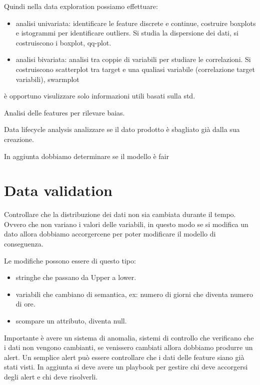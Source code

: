 Quindi nella data exploration possiamo effettuare:
\begin{itemize}
    \item analisi univariata: identificare le feature discrete e continue,
    costruire boxplots e istogrammi per identificare outliers. Si studia la dispersione 
    dei dati, si costruiscono i boxplot, qq-plot.
    \item analisi bivariata: analisi tra coppie di variabili per studiare le correlazioni.
    Si costruiscono scatterplot tra target e una qualiasi variabile (correlazione 
    target variabili), swarmplot
\end{itemize}

è opportuno visulizzare solo informazioni utili basati sulla std.

Analisi delle features per rilevare baias.

Data lifecycle analysis analizzare se il dato prodotto è sbagliato già dalla 
sua creazione.

In aggiunta dobbiamo determinare se il modello è fair

\section{Data validation}
Controllare che la distribuzione dei dati non sia cambiata durante il tempo. Ovvero 
che non variano i valori delle variabili, in questo modo se si modifica un dato 
allora dobbiamo accorgercene per poter modificare il modello di conseguenza.

Le modifiche possono essere di questo tipo:
\begin{itemize}
    \item stringhe che passano da Upper a lower.
    \item variabili che cambiano di semantica, ex: numero di giorni che diventa 
    numero di ore. 
    \item scompare un attributo, diventa null.
\end{itemize}
Importante è avere un sistema di anomalia, sistemi di controllo che verificano che 
i dati non vengono cambianti, se venissero cambiati allora dobbiamo produrre un alert.
Un semplice alert può essere controllare che i dati delle feature siano già stati
visti. In aggiunta si deve avere un playbook per gestire chi deve accorgersi degli 
alert e chi deve risolverli. 